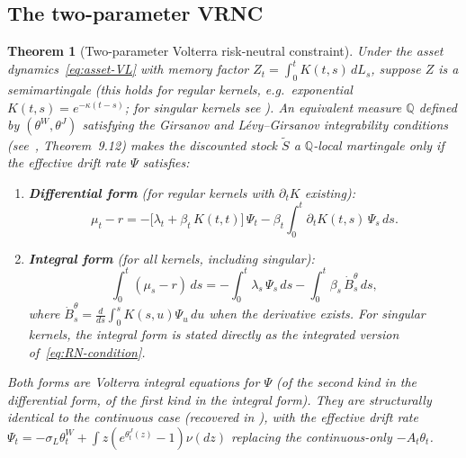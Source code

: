 \documentclass[11pt,a4paper]{article}
\theoremstyle{plain}
\newtheorem{theorem}{Theorem}[section]
\theoremstyle{definition}
\theoremstyle{remark}
\newcommand{\QQ}{\mathbb{Q}}
\begin{document}
\subsection{The two-parameter VRNC}

\begin{theorem}[Two-parameter Volterra risk-neutral constraint]
\label{thm:VRNC-VL}
Under the asset dynamics~\eqref{eq:asset-VL} with memory factor
$Z_t = \int_0^t K(t,s)\,dL_s$, suppose $Z$ is a semimartingale
(this holds for regular kernels, e.g.\ exponential
$K(t,s) = e^{-\kappa(t-s)}$; for singular kernels see
).  An equivalent measure $\QQ$
defined by $(\theta^W, \theta^J)$ satisfying the
Girsanov and L\'evy--Girsanov integrability conditions
(see~\cite{ContTankov2004}, Theorem~9.12)
makes the discounted stock
$\tilde{S}$ a $\QQ$-local martingale only if the
effective drift rate $\Psi$ satisfies:
\begin{enumerate}[label=(\alph*)]
\item \textbf{Differential form} (for regular kernels with
  $\partial_t K$ existing):
  \begin{equation}\label{eq:VRNC-diff}
    \mu_t - r
    = -\bigl[\lambda_t + \beta_t\,K(t,t)\bigr]\,\Psi_t
    - \beta_t\!\int_0^t \partial_t K(t,s)\,\Psi_s\,ds.
  \end{equation}

\item \textbf{Integral form} (for all kernels, including singular):
  \begin{equation}\label{eq:VRNC-int}
    \int_0^t (\mu_s - r)\,ds
    = -\int_0^t \lambda_s\,\Psi_s\,ds
    - \int_0^t \beta_s\,\dot{B}_s^\theta\,ds,
  \end{equation}
  where $\dot{B}_s^\theta = \frac{d}{ds}\int_0^s K(s,u)\Psi_u\,du$
  when the derivative exists.  For singular kernels,
  the integral form is stated directly as the integrated
  version of~\eqref{eq:RN-condition}.
\end{enumerate}
Both forms are Volterra integral equations for $\Psi$
(of the second kind in the differential form, of the first kind
in the integral form).  They are structurally identical to the
continuous case (recovered in ), with the effective drift
rate $\Psi_t = -\sigma_L\theta_t^W
+ \int z(e^{\theta_t^J(z)} - 1)\nu(dz)$ replacing the
continuous-only $-A_t\theta_t$.
\end{theorem}
\end{document}
